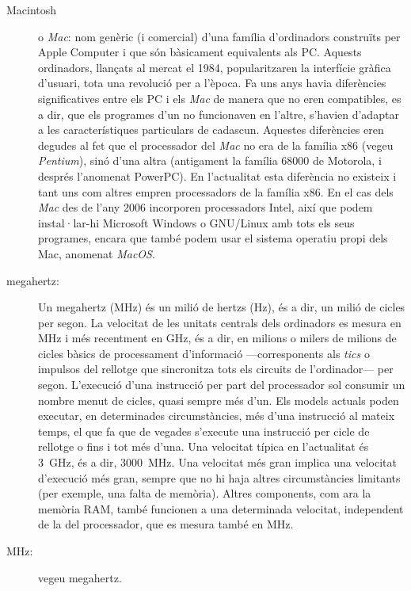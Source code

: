 \begin{description}
\item[Macintosh] o \emph{Mac}: nom genèric (i comercial) d'una família
  d'ordinadors construïts per Apple Computer i que són bàsicament
  equivalents als PC. Aquests ordinadors, llançats al mercat el 1984,
  popularitzaren la interfície gràfica d'usuari, tota una revolució
  per a l'època. Fa uns anys havia diferències significatives entre
  els PC i els \emph{Mac} de manera que no eren compatibles, es a dir,
  que els programes d'un no funcionaven en l'altre, s'havien d'adaptar
  a les característiques particulars de cadascun. Aquestes diferències
  eren degudes al fet que el processador del \emph{Mac} no era de la
  família x86 (vegeu \emph{Pentium}), sinó d'una altra (antigament la
  família 68000 de Motorola, i després l'anomenat PowerPC). En
  l'actualitat esta diferència no existeix i tant uns com altres
  empren processadors de la família x86. En el cas dels \emph{Mac} des
  de l'any 2006 incorporen processadors Intel, així que podem
  instal·lar-hi Microsoft Windows o GNU/Linux amb tots els seus
  programes, encara que també podem usar el sistema operatiu propi
  dels Mac, anomenat \emph{MacOS}.
  
\item[megahertz:] Un megahertz (MHz) és un milió de hertzs (Hz), és a
  dir, un milió de cicles per segon. La velocitat de les unitats
  centrals dels ordinadors es mesura en MHz i més recentment en GHz,
  és a dir, en milions o milers de milions de cicles bàsics de
  processament d'informació ---corresponents als \emph{tics} o
  impulsos del rellotge que sincronitza tots els circuits de
  l'ordinador--- per segon.  L'execució d'una instrucció per part del
  processador sol consumir un nombre menut de cicles, quasi sempre més
  d'un. Els models actuals poden executar, en determinades
  circumstàncies, més d'una instrucció al mateix temps, el que fa que
  de vegades s'execute una instrucció per cicle de rellotge o fins i
  tot més d'una.  Una velocitat típica en l'actualitat és 3~GHz, és a
  dir, 3000~MHz. Una velocitat més gran implica una velocitat
  d'execució més gran, sempre que no hi haja altres circumstàncies
  limitants (per exemple, una falta de memòria).  Altres components,
  com ara la memòria RAM, també funcionen a una determinada velocitat,
  independent de la del processador, que es mesura també en MHz.

\item[MHz:] vegeu megahertz.
  

\end{description}
